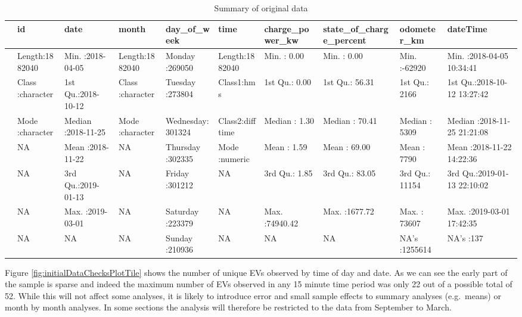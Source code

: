 \documentclass[]{article}
\begin{document}
\begin{table}[t]

\caption{\label{tab:summaryRaw}Summary of original data}
\centering
\begin{tabular}{l|l|l|l|l|l|l|l|l|l}
\hline
  &      id &      date &    month &    day\_of\_week &     time & charge\_power\_kw & state\_of\_charge\_percent &  odometer\_km &    dateTime\\
\hline
 & Length:1882040 & Min.   :2018-04-05 & Length:1882040 & Monday   :269050 & Length:1882040 & Min.   :    0.00 & Min.   :   0.00 & Min.   :-62920 & Min.   :2018-04-05 10:34:41\\
\hline
 & Class :character & 1st Qu.:2018-10-12 & Class :character & Tuesday  :273804 & Class1:hms & 1st Qu.:    0.00 & 1st Qu.:  56.31 & 1st Qu.:  2166 & 1st Qu.:2018-10-12 13:27:42\\
\hline
 & Mode  :character & Median :2018-11-25 & Mode  :character & Wednesday:301324 & Class2:difftime & Median :    1.30 & Median :  70.41 & Median :  5309 & Median :2018-11-25 21:21:08\\
\hline
 & NA & Mean   :2018-11-22 & NA & Thursday :302335 & Mode  :numeric & Mean   :    1.59 & Mean   :  69.00 & Mean   :  7790 & Mean   :2018-11-22 14:22:36\\
\hline
 & NA & 3rd Qu.:2019-01-13 & NA & Friday   :301212 & NA & 3rd Qu.:    1.85 & 3rd Qu.:  83.05 & 3rd Qu.: 11154 & 3rd Qu.:2019-01-13 22:10:02\\
\hline
 & NA & Max.   :2019-03-01 & NA & Saturday :223379 & NA & Max.   :74940.42 & Max.   :1677.72 & Max.   : 73607 & Max.   :2019-03-01 17:42:35\\
\hline
 & NA & NA & NA & Sunday   :210936 & NA & NA & NA & NA's   :1255614 & NA's   :137\\
\hline
\end{tabular}
\end{table}

Figure \ref{fig:initialDataChecksPlotTile} shows the number of unique EVs observed by time of day and date. As we can see the early part of the sample is sparse and indeed the maximum number of EVs observed in any 15 minute time period was only 22 out of a possible total of 52. While this will not affect some analyses, it is likely to introduce error and small sample effects to summary analyses (e.g.~means) or month by month analyses. In some sections the analysis will therefore be restricted to the data from September to March.
\end{document}
